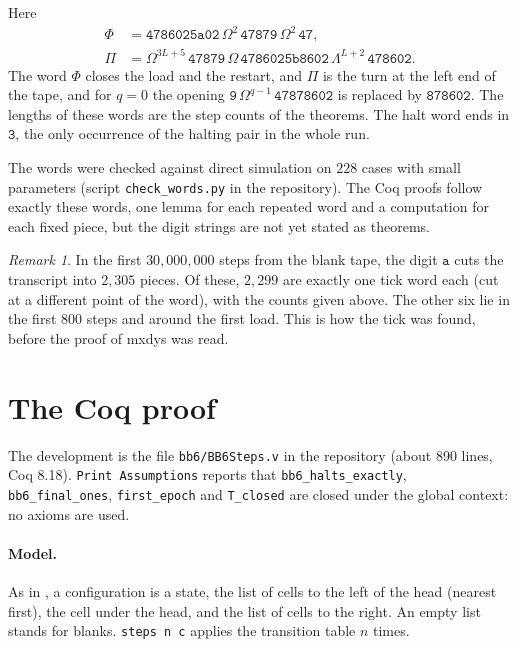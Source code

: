 \documentclass[11pt]{article}
\theoremstyle{remark}
\newtheorem{remark}[theorem]{Remark}
\newcommand{\w}[1]{\mathtt{#1}}
\newcommand{\coq}[1]{\texttt{#1}}
\begin{document}
\noindent Here
\begin{align*}
\Phi &= \w{4786025a02}\,\Omega^{2}\,\w{47879}\,\Omega^{2}\,\w{47},\\
\Pi &= \Omega^{3L+5}\,\w{47879}\,\Omega\,\w{4786025b8602}\,\Lambda^{L+2}\,\w{478602}.
\end{align*}
The word $\Phi$ closes the load and the restart, and $\Pi$
is the turn at the left end of the tape, and for $q=0$ the opening
$\w9\,\Omega^{q-1}\,\w{47878602}$ is replaced by $\w{878602}$. The lengths of
these words are the step counts of the theorems. The halt word ends in $\w3$,
the only occurrence of the halting pair in the whole run.

The words were checked against direct simulation on $228$ cases with small
parameters (script \texttt{check\_words.py} in the repository). The Coq proofs follow exactly these words, one lemma for each
repeated word and a computation for each fixed piece, but the digit strings are
not yet stated as theorems.

\begin{remark}
In the first $30{,}000{,}000$ steps from the blank tape, the digit $\w{a}$ cuts
the transcript into $2{,}305$ pieces. Of these, $2{,}299$ are exactly one tick word each (cut at a different point
of the word), with the counts given above. The other six lie in the first
$800$ steps and around the first load. This is how the tick was found, before
the proof of mxdys was read.
\end{remark}

\section{The Coq proof}

The development is the file \texttt{bb6/BB6Steps.v} in the repository (about
890 lines, Coq 8.18). \texttt{Print Assumptions} reports that
\coq{bb6\_halts\_exactly}, \coq{bb6\_final\_ones}, \coq{first\_epoch} and
\coq{T\_closed} are closed under the global context: no axioms are used.

\paragraph{Model.} As in \cite{bb5}, a configuration is a state, the list of
cells to the left of the head (nearest first), the cell under the head, and the
list of cells to the right. An empty list stands for blanks. \coq{steps n c}
applies the transition table $n$ times.
\end{document}
